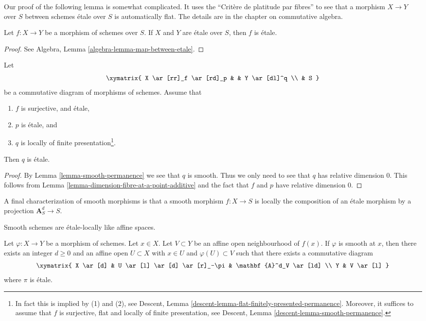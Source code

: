 \noindent
Our proof of the following lemma is somewhat complicated.
It uses the ``Crit\`ere de platitude par fibres'' to see that
a morphism $X \to Y$ over $S$ between schemes \'etale over $S$
is automatically flat. The details are in the chapter on commutative algebra.

\begin{lemma}
\label{lemma-etale-permanence}
Let $f : X \to Y$ be a morphism of schemes over $S$.
If $X$ and $Y$ are \'etale over $S$, then
$f$ is \'etale.
\end{lemma}

\begin{proof}
See Algebra, Lemma \ref{algebra-lemma-map-between-etale}.
\end{proof}

\begin{lemma}
\label{lemma-etale-permanence-two}
Let
$$
\xymatrix{
X \ar[rr]_f \ar[rd]_p & &
Y \ar[dl]^q \\
& S
}
$$
be a commutative diagram of morphisms of schemes. Assume that
\begin{enumerate}
\item $f$ is surjective, and \'etale,
\item $p$ is \'etale, and
\item $q$ is locally of finite presentation\footnote{In fact this
is implied by (1) and (2), see
Descent, Lemma \ref{descent-lemma-flat-finitely-presented-permanence}.
Moreover, it suffices to assume that $f$ is surjective, flat and
locally of finite presentation, see
Descent, Lemma \ref{descent-lemma-smooth-permanence}.}.
\end{enumerate}
Then $q$ is \'etale.
\end{lemma}

\begin{proof}
By Lemma \ref{lemma-smooth-permanence} we see that $q$ is smooth.
Thus we only need to see that $q$ has relative dimension $0$.
This follows from Lemma \ref{lemma-dimension-fibre-at-a-point-additive}
and the fact that $f$ and $p$ have relative dimension $0$.
\end{proof}

\noindent
A final characterization of smooth morphisms is that a smooth morphism
$f : X \to S$ is locally the composition of an \'etale morphism by a projection
$\mathbf{A}_S^d \to S$.

\begin{lemma}
\label{lemma-smooth-etale-over-affine-space}
\begin{slogan}
Smooth schemes are \'etale-locally like affine spaces.
\end{slogan}
Let $\varphi : X \to Y$ be a morphism of schemes. Let $x \in X$.
Let $V \subset Y$ be an affine open neighbourhood of $f(x)$.
If $\varphi$ is smooth at $x$, then there exists an integer $d \geq 0$
and an affine open $U \subset X$ with $x \in U$ and
$\varphi(U) \subset V$ such that there exists a commutative diagram
$$
\xymatrix{
X \ar[d] & U \ar[l] \ar[d] \ar[r]_-\pi & \mathbf{A}^d_V \ar[ld] \\
Y & V \ar[l]
}
$$
where $\pi$ is \'etale.
\end{lemma}

